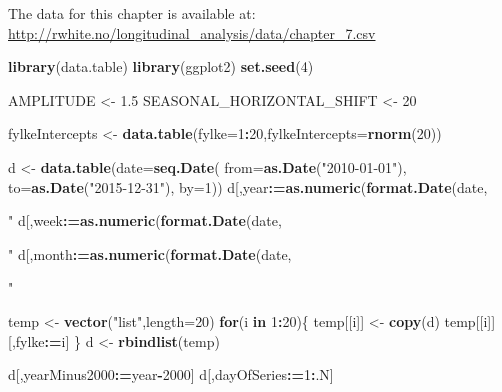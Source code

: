 \documentclass[]{book}
\newenvironment{Shaded}{\begin{snugshade}}{\end{snugshade}}
\newcommand{\KeywordTok}[1]{\textcolor[rgb]{0.13,0.29,0.53}{\textbf{#1}}}
\newcommand{\DataTypeTok}[1]{\textcolor[rgb]{0.13,0.29,0.53}{#1}}
\newcommand{\DecValTok}[1]{\textcolor[rgb]{0.00,0.00,0.81}{#1}}
\newcommand{\FloatTok}[1]{\textcolor[rgb]{0.00,0.00,0.81}{#1}}
\newcommand{\StringTok}[1]{\textcolor[rgb]{0.31,0.60,0.02}{#1}}
\newcommand{\ControlFlowTok}[1]{\textcolor[rgb]{0.13,0.29,0.53}{\textbf{#1}}}
\newcommand{\OperatorTok}[1]{\textcolor[rgb]{0.81,0.36,0.00}{\textbf{#1}}}
\newcommand{\ErrorTok}[1]{\textcolor[rgb]{0.64,0.00,0.00}{\textbf{#1}}}
\newcommand{\NormalTok}[1]{#1}
\begin{document}
The data for this chapter is available at:
\url{http://rwhite.no/longitudinal_analysis/data/chapter_7.csv}

\begin{Shaded}
\begin{Highlighting}[]
\KeywordTok{library}\NormalTok{(data.table)}
\KeywordTok{library}\NormalTok{(ggplot2)}
\KeywordTok{set.seed}\NormalTok{(}\DecValTok{4}\NormalTok{)}

\NormalTok{AMPLITUDE <-}\StringTok{ }\FloatTok{1.5}
\NormalTok{SEASONAL_HORIZONTAL_SHIFT <-}\StringTok{ }\DecValTok{20}

\NormalTok{fylkeIntercepts <-}\StringTok{ }\KeywordTok{data.table}\NormalTok{(}\DataTypeTok{fylke=}\DecValTok{1}\OperatorTok{:}\DecValTok{20}\NormalTok{,}\DataTypeTok{fylkeIntercepts=}\KeywordTok{rnorm}\NormalTok{(}\DecValTok{20}\NormalTok{))}

\NormalTok{d <-}\StringTok{ }\KeywordTok{data.table}\NormalTok{(}\DataTypeTok{date=}\KeywordTok{seq.Date}\NormalTok{(}
  \DataTypeTok{from=}\KeywordTok{as.Date}\NormalTok{(}\StringTok{"2010-01-01"}\NormalTok{),}
  \DataTypeTok{to=}\KeywordTok{as.Date}\NormalTok{(}\StringTok{"2015-12-31"}\NormalTok{),}
  \DataTypeTok{by=}\DecValTok{1}\NormalTok{))}
\NormalTok{d[,year}\OperatorTok{:}\ErrorTok{=}\KeywordTok{as.numeric}\NormalTok{(}\KeywordTok{format.Date}\NormalTok{(date,}\StringTok{"%G"}\NormalTok{))]}
\NormalTok{d[,week}\OperatorTok{:}\ErrorTok{=}\KeywordTok{as.numeric}\NormalTok{(}\KeywordTok{format.Date}\NormalTok{(date,}\StringTok{"%V"}\NormalTok{))]}
\NormalTok{d[,month}\OperatorTok{:}\ErrorTok{=}\KeywordTok{as.numeric}\NormalTok{(}\KeywordTok{format.Date}\NormalTok{(date,}\StringTok{"%m"}\NormalTok{))]}

\NormalTok{temp <-}\StringTok{ }\KeywordTok{vector}\NormalTok{(}\StringTok{"list"}\NormalTok{,}\DataTypeTok{length=}\DecValTok{20}\NormalTok{)}
\ControlFlowTok{for}\NormalTok{(i }\ControlFlowTok{in} \DecValTok{1}\OperatorTok{:}\DecValTok{20}\NormalTok{)\{}
\NormalTok{  temp[[i]] <-}\StringTok{ }\KeywordTok{copy}\NormalTok{(d)}
\NormalTok{  temp[[i]][,fylke}\OperatorTok{:}\ErrorTok{=}\NormalTok{i]}
\NormalTok{\}}
\NormalTok{d <-}\StringTok{ }\KeywordTok{rbindlist}\NormalTok{(temp)}

\NormalTok{d[,yearMinus2000}\OperatorTok{:}\ErrorTok{=}\NormalTok{year}\OperatorTok{-}\DecValTok{2000}\NormalTok{]}
\NormalTok{d[,dayOfSeries}\OperatorTok{:}\ErrorTok{=}\DecValTok{1}\OperatorTok{:}\NormalTok{.N]}

}}}
\end{Highlighting}
\end{Shaded}
\end{document}
